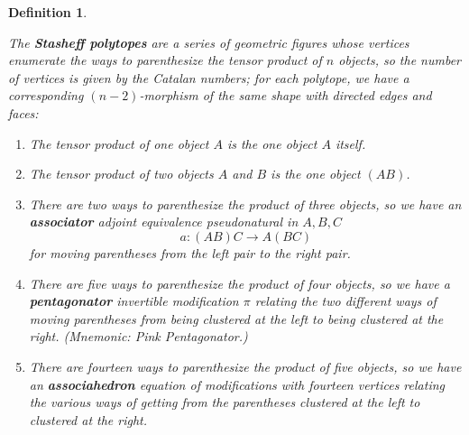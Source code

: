 \documentclass{article}
\newtheorem{defn}{Definition}
\newcommand{\maps}{\colon}
\begin{document}
\begin{defn}
\begin{itemize}
The {\bf Stasheff polytopes} \cite{Stasheff} are a series of geometric figures whose vertices enumerate the ways to parenthesize the tensor product of $n$ objects, so the number of vertices is given by the Catalan numbers; for each polytope, we have a corresponding $(n-2)$-morphism of the same shape with directed edges and faces:
  \begin{enumerate}
    \item The tensor product of one object $A$ is the one object $A$ itself.
    \item The tensor product of two objects $A$ and $B$ is the one object $(A B)$.
    \item There are two ways to parenthesize the product of three objects, so we have an {\bf associator} adjoint equivalence pseudonatural in $A,B,C$
        \[ a\maps (A B) C \rightarrow A (B C) \]
      for moving parentheses from the left pair to the right pair.
    \item There are five ways to parenthesize the product of four objects, so we have a {\bf pentagonator} invertible modification $\pi$ relating the two different ways of moving parentheses from being clustered at the left to being clustered at the right.  (Mnemonic: Pink Pentagonator.)
      \begin{center}
      \end{center}
    \item There are fourteen ways to parenthesize the product of five objects, so we have an {\bf associahedron} equation of modifications with fourteen vertices relating the various ways of getting from the parentheses clustered at the left to clustered at the right.
      \begin{center}

\end{center}
\end{enumerate}
\end{itemize}
\end{defn}
\end{document}
